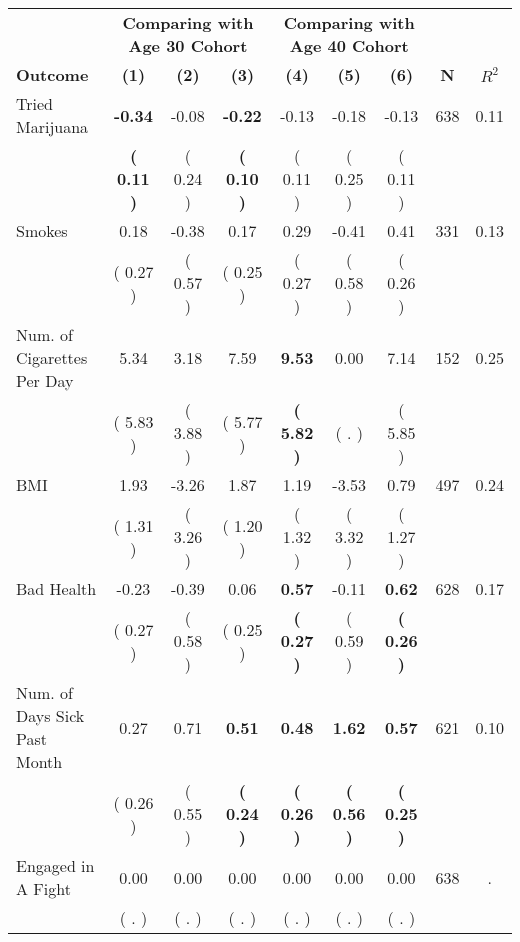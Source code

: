 \begin{tabular}{lcccccccc}
\toprule
 & \multicolumn{3}{c}{\textbf{Comparing with Age 30 Cohort}} & \multicolumn{3}{c}{\textbf{Comparing with Age 40 Cohort}} & \\
\cmidrule(lr){2-4} \cmidrule(lr){5-7} 
 \textbf{Outcome} & \textbf{(1)} & \textbf{(2)} & \textbf{(3)} & \textbf{(4)} & \textbf{(5)} & \textbf{(6)} & \textbf{N} & \textbf{$ R^2$} \\
\midrule
Tried Marijuana & \textbf{    -0.34} &     -0.08 & \textbf{    -0.22} &     -0.13 &     -0.18 &     -0.13 & 638 &       0.11 \\ 
 & \textbf{(     0.11 )} & (     0.24 ) & \textbf{(     0.10 )} & (     0.11 ) & (     0.25 ) & (     0.11 ) & \\
Smokes &      0.18 &     -0.38 &      0.17 &      0.29 &     -0.41 &      0.41 & 331 &       0.13 \\ 
 & (     0.27 ) & (     0.57 ) & (     0.25 ) & (     0.27 ) & (     0.58 ) & (     0.26 ) & \\
Num. of Cigarettes Per Day &      5.34 &      3.18 &      7.59 & \textbf{     9.53} &      0.00 &      7.14 & 152 &       0.25 \\ 
 & (     5.83 ) & (     3.88 ) & (     5.77 ) & \textbf{(     5.82 )} & (        . ) & (     5.85 ) & \\
BMI &      1.93 &     -3.26 &      1.87 &      1.19 &     -3.53 &      0.79 & 497 &       0.24 \\ 
 & (     1.31 ) & (     3.26 ) & (     1.20 ) & (     1.32 ) & (     3.32 ) & (     1.27 ) & \\
Bad Health &     -0.23 &     -0.39 &      0.06 & \textbf{     0.57} &     -0.11 & \textbf{     0.62} & 628 &       0.17 \\ 
 & (     0.27 ) & (     0.58 ) & (     0.25 ) & \textbf{(     0.27 )} & (     0.59 ) & \textbf{(     0.26 )} & \\
Num. of Days Sick Past Month &      0.27 &      0.71 & \textbf{     0.51} & \textbf{     0.48} & \textbf{     1.62} & \textbf{     0.57} & 621 &       0.10 \\ 
 & (     0.26 ) & (     0.55 ) & \textbf{(     0.24 )} & \textbf{(     0.26 )} & \textbf{(     0.56 )} & \textbf{(     0.25 )} & \\
Engaged in A Fight &      0.00 &      0.00 &      0.00 &      0.00 &      0.00 &      0.00 & 638 &          . \\ 
 & (        . ) & (        . ) & (        . ) & (        . ) & (        . ) & (        . ) & \\

\end{tabular}
